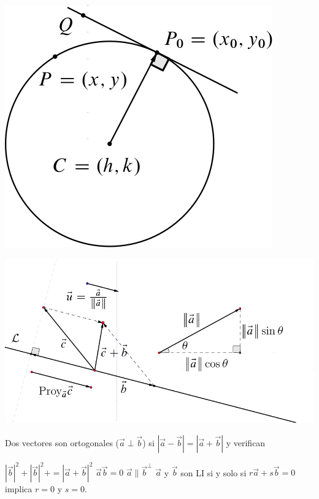 \documentclass[12pt,]{report}
\let\origfigure=\figure
\let\endorigfigure=\endfigure
\renewenvironment{figure}[1][]{%
  \origfigure[H]
}{%
  \endorigfigure
}
\theoremstyle{slplain}
\begin{document}
\begin{figure}

{\centering \includegraphics{circunferencia} 

}

\caption{Elipse vectorial}\label{fig:C1}
\end{figure}

\begin{figure}

{\centering \includegraphics{vector} 

}

\caption{Elipse vectorial}\label{fig:C2}
\end{figure}

Dos vectores son ortogonales (\(\vec{a}\perp\vec{b}\)) si \(\left|\vec{a}-\vec{b}\right|=\left|\vec{a}+\vec{b}\right|\) y verifican

\(\left|\vec{b}\right|^2+\left|\vec{b}\right|^2+=\left|\vec{a}+\vec{b}\right|^2\)
\(\vec{a}\vec{b}=0\)
\(\vec{a}\parallel\vec{b}^\perp\)
\(\vec{a}\) y \(\vec{b}\) son LI si y solo si \(r\vec{a}+s\vec{b}=0\) implica \(r=0\) y \(s=0\).
\end{document}
